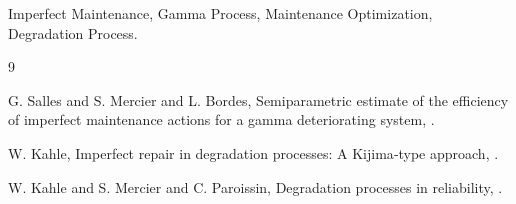 \documentclass{rps-esrel2021}
\begin{document}







\vspace*{10pt}


 Imperfect Maintenance, Gamma Process, Maintenance Optimization, Degradation Process.


\begin{thebibliography}{9}

\bibitem{}G. Salles and S. Mercier and L. Bordes, Semiparametric estimate of the efficiency of imperfect maintenance actions for a gamma deteriorating system, .

\bibitem{}W. Kahle, Imperfect repair in degradation processes: A Kijima‐type approach, .

\bibitem{}W. Kahle and S. Mercier and C. Paroissin, Degradation processes in reliability, .


\end{thebibliography}
\end{document}
